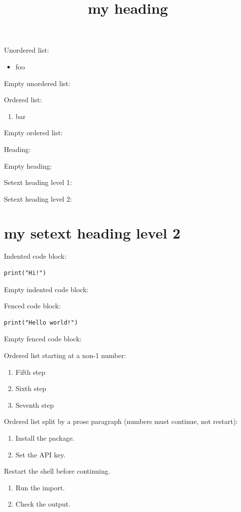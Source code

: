 \documentclass[11pt,a4paper]{article}
\title{my heading}
\begin{document}
\maketitle

Unordered list:

\begin{itemize}
\item foo
\end{itemize}

Empty unordered list:

Ordered list:

\begin{enumerate}
\item bar
\end{enumerate}

Empty ordered list:

Heading:

Empty heading:

Setext heading level 1:

Setext heading level 2:

\section{my setext heading level 2}

Indented code block:

\begin{verbatim}
print("Hi!")
\end{verbatim}

Empty indented code block:

Fenced code block:

\begin{verbatim}
print("Hello world!")
\end{verbatim}

Empty fenced code block:

Ordered list starting at a non-1 number:

\begin{enumerate}
\item Fifth step
\item Sixth step
\item Seventh step
\end{enumerate}

Ordered list split by a prose paragraph (numbers must continue, not restart):

\begin{enumerate}
\item Install the package.
\item Set the API key.
\end{enumerate}

Restart the shell before continuing.

\begin{enumerate}
\item Run the import.
\item Check the output.
\end{enumerate}
\end{document}
